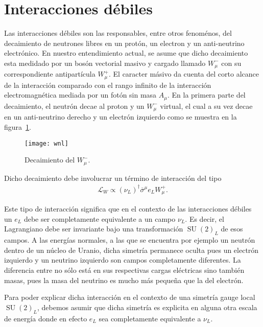 \section{Interacciones débiles}
\begin{frame}
Las interacciones débiles son las responsables, entre otros fenoménos,
del decaimiento de neutrones libres en un protón, un electron y un
anti-neutrino electrónico. En nuestro entendimiento actual, se asume
que dicho decaimiento esta medidado por un bosón vectorial masivo y
cargado llamado $W^-_{\mu}$ con su correspondiente antipartícula
$W^{+}_{\mu}$. El caracter másivo da cuenta del corto alcance de la
interacción comparado con el rango infinito de la
interacción electromagnética mediada por un fotón sin masa
$A_{\mu}$. En la primera parte del decaimiento, el neutrón decae al
proton y un $W^{-}_{\mu}$ virtual, el cual a su vez decae en un
anti-neutrino derecho y un electrón izquierdo como se muestra en la
figura~\ref{fig:wnl}.

\begin{figure}
  \centering
  \texttt{[image: wnl]}
  \caption{Decaimiento del $W_\mu^-$.}
  \label{fig:wnl}
\end{figure}

Dicho decaimiento debe involucrar un término de interacción del tipo
\begin{align}
  \mathcal{L}_{W}\propto \left( \nu_L \right)^{\dagger}\overline{\sigma}^{\mu} e_L W_{\mu}^{+}.
\end{align}



Este tipo de interacción significa que en el contexto de las interacciones débiles un $e_L$ debe ser completamente
equivalente a un campo $\nu_L$. Es decir, el Lagrangiano debe ser
invariante bajo una transformación $\operatorname{SU}(2)_L$ de esos campos. A las energías normales, a las que se encuentra por ejemplo un neutrón dentro de un núcleo de Uranio, dicha simetría permanece oculta pues un electrón izquierdo y un neutrino izquierdo son campos completamente diferentes.
La
diferencia entre no sólo está en sus respectivas cargas eléctricas sino también
masas, pues la masa del neutrino es mucho más pequeña que la del electrón. 

Para poder explicar dicha interacción en el contexto de una simetría gauge local $\operatorname{SU}(2)_L$, debemos asumir que dicha simetría es explicita en alguna otra escala de energía donde en efecto  $e_L$ sea completamente
equivalente a $\nu_L$.


\end{frame}
